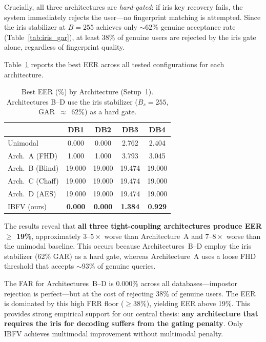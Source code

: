 \documentclass[3p,twocolumn]{elsarticle}
\newcommand{\IBFV}{\textsf{IBFV}}
\begin{document}
Crucially, all three architectures are \emph{hard-gated}: if iris key recovery fails, the system immediately rejects the user---no fingerprint matching is attempted. Since the iris stabilizer at $B = 255$ achieves only $\sim$62\% genuine acceptance rate (Table~\ref{tab:iris_gar}), at least 38\% of genuine users are rejected by the iris gate alone, regardless of fingerprint quality.

Table~\ref{tab:arch_bcd} reports the best EER across all tested configurations for each architecture.

\begin{table}[t]
\centering
\caption{Best EER (\%) by Architecture (Setup~1). Architectures B--D use the iris stabilizer ($B_s = 255$, GAR~$\approx$~62\%) as a hard gate.}
\label{tab:arch_bcd}
\begin{tabular}{@{}l c c c c@{}}
\toprule
 & \textbf{DB1} & \textbf{DB2} & \textbf{DB3} & \textbf{DB4} \\
\midrule
Unimodal        & 0.000 & 0.000 & 2.762 & 2.404 \\
Arch.~A (FHD)   & 1.000 & 1.000 & 3.793 & 3.045 \\
Arch.~B (Blind) & 19.000 & 19.000 & 19.474 & 19.000 \\
Arch.~C (Chaff) & 19.000 & 19.000 & 19.474 & 19.000 \\
Arch.~D (AES)   & 19.000 & 19.000 & 19.474 & 19.000 \\
\IBFV{} (ours)  & \textbf{0.000} & \textbf{0.000} & \textbf{1.384} & \textbf{0.929} \\
\bottomrule
\end{tabular}
\end{table}

The results reveal that \textbf{all three tight-coupling architectures produce EER $\geq$ 19\%}, approximately $3$--$5\times$ worse than Architecture~A and $7$--$8\times$ worse than the unimodal baseline. This occurs because Architectures~B--D employ the iris stabilizer (62\% GAR) as a hard gate, whereas Architecture~A uses a loose FHD threshold that accepts $\sim$93\% of genuine queries.

The FAR for Architectures~B--D is 0.000\% across all databases---impostor rejection is perfect---but at the cost of rejecting 38\% of genuine users. The EER is dominated by this high FRR floor ($\geq 38\%$), yielding EER above 19\%. This provides strong empirical support for our central thesis: \textbf{any architecture that requires the iris for decoding suffers from the gating penalty}. Only \IBFV{} achieves multimodal improvement without multimodal penalty.
\end{document}
